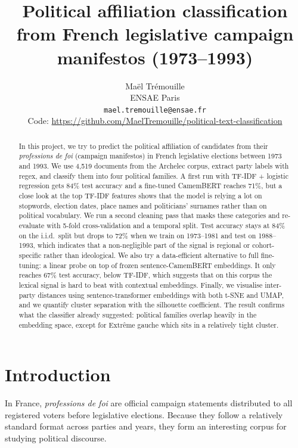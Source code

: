 \documentclass{article}
\title{Political affiliation classification from French legislative campaign manifestos (1973--1993)}
\author{%
  Maël Trémouille \\
  ENSAE Paris \\
  \texttt{mael.tremouille@ensae.fr} \\
  Code: \url{https://github.com/MaelTremouille/political-text-classification}
}
\begin{document}
\maketitle

\begin{abstract}
In this project, we try to predict the political affiliation of candidates from their \textit{professions de foi} (campaign manifestos) in French legislative elections between 1973 and 1993.
We use 4{,}519 documents from the Archelec corpus, extract party labels with regex, and classify them into four political families.
A first run with TF-IDF + logistic regression gets 84\% test accuracy and a fine-tuned CamemBERT reaches 71\%, but a close look at the top TF-IDF features shows that the model is relying a lot on stopwords, election dates, place names and politicians' surnames rather than on political vocabulary. We run a second cleaning pass that masks these categories and re-evaluate with 5-fold cross-validation and a temporal split. Test accuracy stays at 84\% on the i.i.d.\ split but drops to 72\% when we train on 1973--1981 and test on 1988--1993, which indicates that a non-negligible part of the signal is regional or cohort-specific rather than ideological.
We also try a data-efficient alternative to full fine-tuning: a linear probe on top of frozen sentence-CamemBERT embeddings. It only reaches 67\% test accuracy, below TF-IDF, which suggests that on this corpus the lexical signal is hard to beat with contextual embeddings.
Finally, we visualise inter-party distances using sentence-transformer embeddings with both t-SNE and UMAP, and we quantify cluster separation with the silhouette coefficient. The result confirms what the classifier already suggested: political families overlap heavily in the embedding space, except for Extr\^{e}me gauche which sits in a relatively tight cluster.
\end{abstract}

\section{Introduction}
\label{sec:intro}

In France, \textit{professions de foi} are official campaign statements distributed to all registered voters before legislative elections. Because they follow a relatively standard format across parties and years, they form an interesting corpus for studying political discourse.
\end{document}
